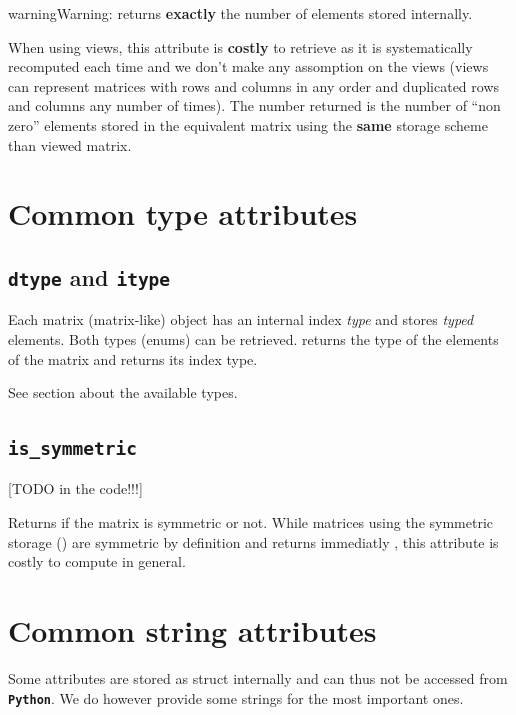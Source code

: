 \documentclass[letterpaper,10pt,english]{sphinxmanual}
\begin{document}
\begin{notice}{warning}{Warning:}
 returns \textbf{exactly} the number of elements stored internally.
\end{notice}

When using views, this attribute is \textbf{costly} to retrieve as it is systematically recomputed each time and we don't make any assomption on the views (views can represent matrices with rows and columns in any order and duplicated
rows and columns any number of times). The number returned is the number of ``non zero'' elements stored in the equivalent matrix using the \textbf{same} storage scheme than viewed matrix.


\section{Common type attributes}
\label{cysparse_basics:common-type-attributes}

\subsection{\texttt{dtype} and \texttt{itype}}
\label{cysparse_basics:dtype-and-itype}
Each matrix (matrix-like) object has an internal index \emph{type} and stores \emph{typed} elements. Both types (enums) can be retrieved.
 returns the type of the elements of the matrix and  returns its index type.

See section {\hyperref[types:availabe-types]{\emph{}}} about the available types.


\subsection{\texttt{is\_symmetric}}
\label{cysparse_basics:is-symmetric}
{[}TODO in the code!!!{]}

Returns if the matrix is symmetric or not. While matrices using the symmetric storage () are symmetric by definition and  returns immediatly , this attribute is costly to
compute in general.


\section{Common string attributes}
\label{cysparse_basics:common-string-attributes}
Some attributes are stored as  struct internally and can thus not be accessed from \textbf{\texttt{Python}}. We do however provide some strings for the most important ones.
\end{document}

